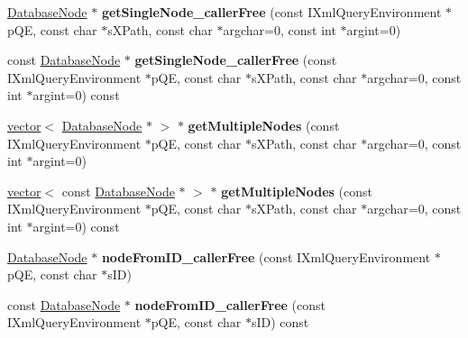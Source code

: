 \begin{DoxyCompactItemize}
\item 
\hypertarget{classgeneral__server_1_1DatabaseNode_aadc78976e089f57457feb6b7916a4fcb}{\hyperlink{classgeneral__server_1_1DatabaseNode}{\-Database\-Node} $\ast$ {\bfseries get\-Single\-Node\-\_\-caller\-Free} (const \-I\-Xml\-Query\-Environment $\ast$p\-Q\-E, const char $\ast$s\-X\-Path, const char $\ast$argchar=0, const int $\ast$argint=0)}\label{classgeneral__server_1_1DatabaseNode_aadc78976e089f57457feb6b7916a4fcb}

\item 
\hypertarget{classgeneral__server_1_1DatabaseNode_ae5f2606e58bef8fd58aa4e2043a3c314}{const \hyperlink{classgeneral__server_1_1DatabaseNode}{\-Database\-Node} $\ast$ {\bfseries get\-Single\-Node\-\_\-caller\-Free} (const \-I\-Xml\-Query\-Environment $\ast$p\-Q\-E, const char $\ast$s\-X\-Path, const char $\ast$argchar=0, const int $\ast$argint=0) const }\label{classgeneral__server_1_1DatabaseNode_ae5f2606e58bef8fd58aa4e2043a3c314}

\item 
\hypertarget{classgeneral__server_1_1DatabaseNode_a0bc8edc0be755ef22a36b5b3b6d1704f}{\hyperlink{classvector}{vector}$<$ \hyperlink{classgeneral__server_1_1DatabaseNode}{\-Database\-Node} $\ast$ $>$ $\ast$ {\bfseries get\-Multiple\-Nodes} (const \-I\-Xml\-Query\-Environment $\ast$p\-Q\-E, const char $\ast$s\-X\-Path, const char $\ast$argchar=0, const int $\ast$argint=0)}\label{classgeneral__server_1_1DatabaseNode_a0bc8edc0be755ef22a36b5b3b6d1704f}

\item 
\hypertarget{classgeneral__server_1_1DatabaseNode_ad0cde10a5fbedd7a8261f578f3a9983e}{\hyperlink{classvector}{vector}$<$ const \hyperlink{classgeneral__server_1_1DatabaseNode}{\-Database\-Node} $\ast$ $>$ $\ast$ {\bfseries get\-Multiple\-Nodes} (const \-I\-Xml\-Query\-Environment $\ast$p\-Q\-E, const char $\ast$s\-X\-Path, const char $\ast$argchar=0, const int $\ast$argint=0) const }\label{classgeneral__server_1_1DatabaseNode_ad0cde10a5fbedd7a8261f578f3a9983e}

\item 
\hypertarget{classgeneral__server_1_1DatabaseNode_a0cb50e9466d584ee3b2d97e6a4f42a40}{\hyperlink{classgeneral__server_1_1DatabaseNode}{\-Database\-Node} $\ast$ {\bfseries node\-From\-I\-D\-\_\-caller\-Free} (const \-I\-Xml\-Query\-Environment $\ast$p\-Q\-E, const char $\ast$s\-I\-D)}\label{classgeneral__server_1_1DatabaseNode_a0cb50e9466d584ee3b2d97e6a4f42a40}

\item 
\hypertarget{classgeneral__server_1_1DatabaseNode_a193a80c5b3ca4748fbaafa750bccbb01}{const \hyperlink{classgeneral__server_1_1DatabaseNode}{\-Database\-Node} $\ast$ {\bfseries node\-From\-I\-D\-\_\-caller\-Free} (const \-I\-Xml\-Query\-Environment $\ast$p\-Q\-E, const char $\ast$s\-I\-D) const }\label{classgeneral__server_1_1DatabaseNode_a193a80c5b3ca4748fbaafa750bccbb01}


\end{DoxyCompactItemize}
